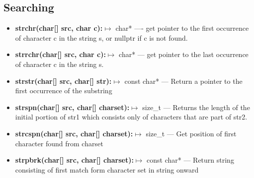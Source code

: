 \documentclass{report}
\begin{document}
    \subsection{Searching}
    \begin{itemize}
        \item \textbf{strchr(char[] src, char c):}$\mapsto$ char* ---- get pointer to the first occurrence of character c in the string s, or nullptr if c is not found.
        \item \textbf{strrchr(char[] src, char c):}$\mapsto$ char* --- get pointer to the last occurrence of character c in the string s.
        \item \textbf{strstr(char[] src, char[] str):}$\mapsto$ const char* --- Return a pointer to the first occurrence of the substring 
        \item \textbf{strspn(char[] src, char[] charset):}$\mapsto$ size\_t --- Returns the length of the initial portion of str1 which consists only of characters that are part of str2.
        \item \textbf{strcspn(char[] src, char[] charset):}$\mapsto$ size\_t --- Get position of first character found from charset 
        \item \textbf{strpbrk(char[] src, char[] charset):}$\mapsto$ const char* --- Return string consisting of first match form character set in string onward
    \end{itemize}

    \bigbreak \noindent 
\end{document}
